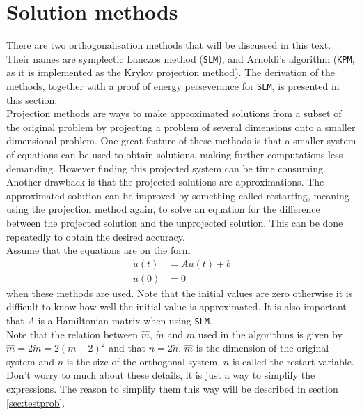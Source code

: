 \section{Solution methods} \label{sec:solmet} %
\noindent There are two orthogonalisation methods that will be discussed in this text. Their names are symplectic Lanczos method (\texttt{SLM}), and Arnoldi's algorithm (\texttt{KPM}, as it is implemented as the Krylov projection method). The derivation of the methods, together with a proof of energy perseverance for \texttt{SLM}, is presented in this section. \\


\noindent Projection methods are ways to make approximated solutions from a subset of the original problem by projecting a problem of several dimensions onto a smaller dimensional problem. One great feature of these methods is that a smaller system of equations can be used to obtain solutions, making further computations less demanding. However finding this projected system can be time consuming. Another drawback is that the projected solutions are approximations. The approximated solution can be improved by something called restarting, meaning using the projection method again, to solve an equation for the difference between the projected solution and the unprojected solution. This can be done repeatedly to obtain the desired accuracy. \\

\noindent Assume that the equations are on the form
\begin{equation}
\begin{aligned}
\dot{u}(t) &= Au(t) + b \\
u(0) &= 0
\end{aligned}
\label{eqn:PMform}
\end{equation}
\noindent when these methods are used. Note that the initial values are zero otherwise it is difficult to know how well the initial value is approximated. It is also important that $A$ is a Hamiltonian matrix when using \texttt{SLM}. \\

\noindent Note that the relation between $\hat{m}$, $\tilde{m}$ and $m$ used in the algorithms is given by $\hat{m} = 2\tilde{m}= 2(m-2)^2$ and that $ n = 2\tilde{n}$. $\hat{m}$ is the dimension of the original system and $n$ is the size of the orthogonal system. $n$ is called the restart variable. Don't worry to much about these details, it is just a way to simplify the expressions. The reason to simplify them this way will be described in section \ref{sec:testprob}. \\

